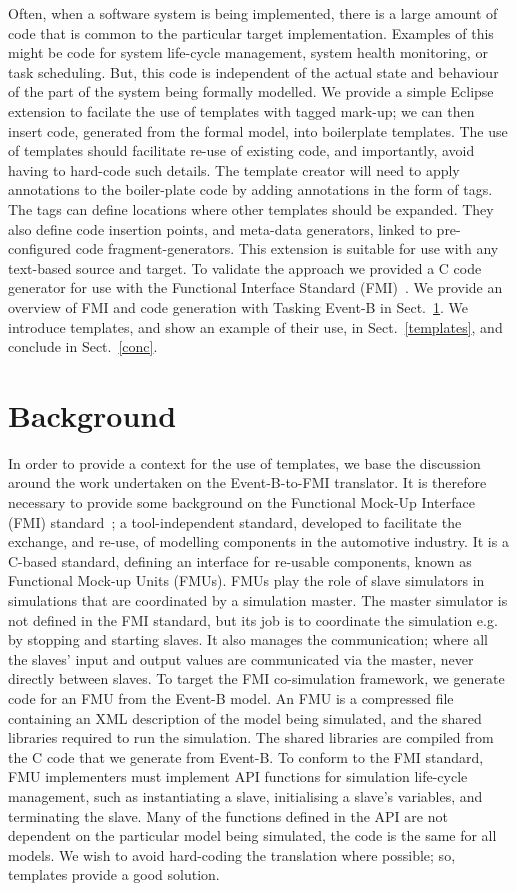 \documentclass{llncs}%
\begin{document}
Often, when a software system is being implemented, there is a large amount of code that is common to the particular target implementation. Examples of this might be code for system life-cycle management, system health monitoring, or task scheduling. But, this code is independent of the actual state and behaviour of the part of the system being formally modelled. We provide a simple Eclipse extension to facilate the use of templates with tagged mark-up; we can then insert  code, generated from the formal model,  into boilerplate templates. The use of templates should facilitate re-use of existing code, and importantly, avoid having to hard-code such details. The template creator will need to apply annotations to the boiler-plate code by adding annotations in the form of tags. The tags can define locations where other templates should be expanded. They also define code insertion points, and meta-data generators, linked to pre-configured code fragment-generators. This extension is suitable for use with any text-based source and target. To validate the approach we provided a C code generator for use with the Functional Interface Standard (FMI)~\cite{FMISTD}. We provide an overview of FMI and code generation with Tasking Event-B in Sect.~\ref{Background}. We introduce templates, and show an example of their use, in Sect.~\ref{templates}, and conclude in Sect.~\ref{conc}.
%
%
\section{Background}\label{Background}
%
In order to provide a context for the use of templates, we base the discussion around the work undertaken on the Event-B-to-FMI translator. It is therefore necessary to provide some background on the Functional Mock-Up Interface (FMI) standard~\cite{FMISTD}; a tool-independent standard, developed to facilitate the exchange, and re-use, of modelling components in the automotive industry. It is a C-based standard, defining an interface for re-usable components, known as Functional Mock-up Units (FMUs). FMUs play the role of slave simulators in simulations that are coordinated by a simulation master. The master simulator is not defined in the FMI standard, but its job is to coordinate the simulation e.g. by stopping and starting slaves. It also manages the communication; where all the slaves' input and output values are communicated via the master, never directly between slaves. To target the FMI co-simulation framework, we generate code for an FMU from the Event-B model. An FMU is a compressed file containing an XML description of the model being simulated, and the shared libraries required to run the simulation. The shared libraries are compiled from the C code that we generate from Event-B. To conform to the FMI standard, FMU implementers must implement API functions for simulation life-cycle management, such as instantiating a slave, initialising a slave's variables, and terminating the slave. Many of the functions defined in the API are not dependent on the particular model being simulated, the code is the same for all models. We wish to avoid hard-coding the translation where possible; so, templates provide a good solution.    
\end{document}
